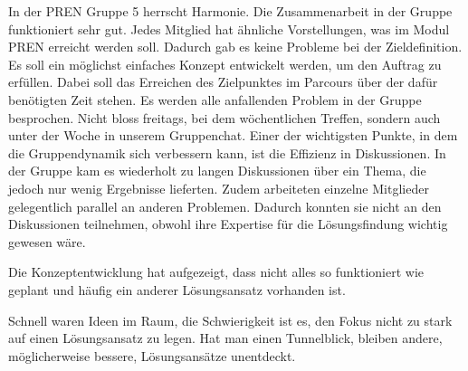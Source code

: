 \documentclass[../main.tex]{subfiles}
\begin{document}
In der PREN Gruppe 5 herrscht Harmonie.
\newline
\newline
Die Zusammenarbeit in der Gruppe funktioniert sehr gut. Jedes Mitglied hat ähnliche Vorstellungen, was im Modul PREN erreicht werden soll. Dadurch gab es keine Probleme bei der Zieldefinition. Es soll ein möglichst einfaches Konzept entwickelt werden, um den Auftrag zu erfüllen. Dabei soll das Erreichen des Zielpunktes im Parcours über der dafür benötigten Zeit stehen. Es werden alle anfallenden Problem in der Gruppe besprochen. Nicht bloss freitags, bei dem wöchentlichen Treffen, sondern auch unter der Woche in unserem Gruppenchat. Einer der wichtigsten Punkte, in dem die Gruppendynamik sich verbessern kann, ist die Effizienz in Diskussionen. In der Gruppe kam es wiederholt zu langen Diskussionen über ein Thema, die jedoch nur wenig Ergebnisse lieferten. Zudem arbeiteten einzelne Mitglieder gelegentlich parallel an anderen Problemen. Dadurch konnten sie nicht an den Diskussionen teilnehmen, obwohl ihre Expertise für die Lösungsfindung wichtig gewesen wäre.

Die Konzeptentwicklung hat aufgezeigt, dass nicht alles so funktioniert wie geplant und häufig ein anderer Lösungsansatz vorhanden ist. 

Schnell waren Ideen im Raum, die Schwierigkeit ist es, den Fokus nicht zu stark auf einen Lösungsansatz zu legen. Hat man einen Tunnelblick, bleiben andere, möglicherweise bessere, Lösungsansätze unentdeckt. 
\end{document}
